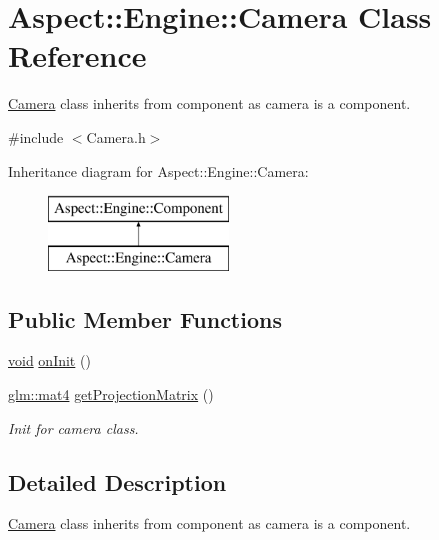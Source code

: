 \hypertarget{class_aspect_1_1_engine_1_1_camera}{}\section{Aspect\+:\+:Engine\+:\+:Camera Class Reference}
\label{class_aspect_1_1_engine_1_1_camera}


\mbox{\hyperlink{class_aspect_1_1_engine_1_1_camera}{Camera}} class inherits from component as camera is a component.  




{\ttfamily \#include $<$Camera.\+h$>$}

Inheritance diagram for Aspect\+:\+:Engine\+:\+:Camera\+:\begin{figure}[H]
\begin{center}
\leavevmode
\includegraphics[height=2.000000cm]{class_aspect_1_1_engine_1_1_camera}
\end{center}
\end{figure}
\subsection*{Public Member Functions}
\begin{DoxyCompactItemize}
\item 
\mbox{\hyperlink{_s_d_l__opengles2__gl2ext_8h_ae5d8fa23ad07c48bb609509eae494c95}{void}} \mbox{\hyperlink{class_aspect_1_1_engine_1_1_camera_a30e0d0ecb4c5c9fd43cfe8323e600d17}{on\+Init}} ()
\item 
\mbox{\hyperlink{group__core__types_ga7dcd2365c2e368e6af5b7adeb6a9c8df}{glm\+::mat4}} \mbox{\hyperlink{class_aspect_1_1_engine_1_1_camera_a044257842c27ddee66a901adb5ca828d}{get\+Projection\+Matrix}} ()
\begin{DoxyCompactList}\small\item\em Init for camera class. \end{DoxyCompactList}\end{DoxyCompactItemize}


\subsection{Detailed Description}
\mbox{\hyperlink{class_aspect_1_1_engine_1_1_camera}{Camera}} class inherits from component as camera is a component. 

